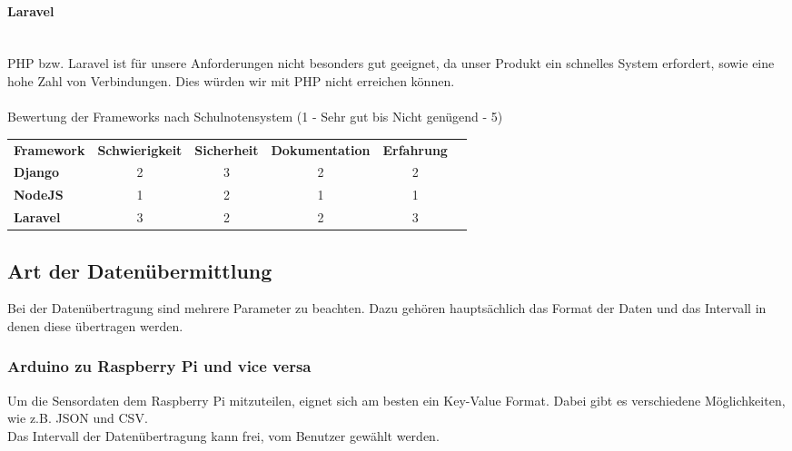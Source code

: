 \paragraph{Laravel} \mbox{}\\
PHP bzw. Laravel ist f\"ur unsere Anforderungen nicht besonders gut geeignet, da unser Produkt ein schnelles System erfordert, sowie eine hohe Zahl von Verbindungen. Dies w\"urden wir mit PHP nicht erreichen k\"onnen.
\\ \mbox{} \\
Bewertung der Frameworks nach Schulnotensystem (1 - Sehr gut bis Nicht gen\"ugend - 5)
\begin{table}[ht]
\centering
\begin{tabular}{|l|c|c|c|c|l}
\cline{1-5}
\textbf{Framework} & \multicolumn{1}{l|}{\textbf{Schwierigkeit}} & \multicolumn{1}{l|}{\textbf{Sicherheit}} & \multicolumn{1}{l|}{\textbf{Dokumentation}} & \multicolumn{1}{l|}{\textbf{Erfahrung}} & \\ \cline{1-5}
\textbf{Django}    & 2                                         & 3                                      & 2                                         & 2                                     & \\ \cline{1-5}
\textbf{NodeJS}    & 1                                         & 2                                      & 1                                         & 1                                     & \\ \cline{1-5}
\textbf{Laravel}   & 3                                         & 2                                      & 2                                         & 3                                     & \\ \cline{1-5}
\end{tabular}
\end{table}
\newpage

\subsection{Art der Daten\"ubermittlung}
Bei der Daten\"ubertragung sind mehrere Parameter zu beachten. Dazu geh\"oren haupts\"achlich das Format der Daten und das Intervall in denen diese \"ubertragen werden.
\subsubsection{Arduino zu Raspberry Pi und vice versa}
Um die Sensordaten dem Raspberry Pi mitzuteilen, eignet sich am besten ein Key-Value Format. Dabei gibt es verschiedene M\"oglichkeiten, wie z.B. JSON und CSV. \\
Das Intervall der Daten\"ubertragung kann frei, vom Benutzer gew\"ahlt werden.
